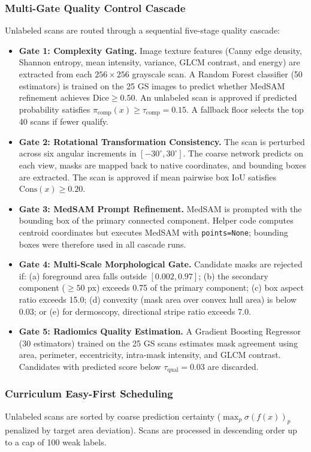 \documentclass[journal,11pt,onecolumn,draftclsnofoot]{IEEEtran}
\begin{document}
\subsubsection{Multi-Gate Quality Control Cascade}
Unlabeled scans are routed through a sequential five-stage quality cascade:
\begin{itemize}
    \item \textbf{Gate 1: Complexity Gating.} Image texture features (Canny edge density, Shannon entropy, mean intensity, variance, GLCM contrast, and energy) are extracted from each $256 \times 256$ grayscale scan. A Random Forest classifier (50 estimators) is trained on the 25 GS images to predict whether MedSAM refinement achieves $\mathrm{Dice} \ge 0.50$. An unlabeled scan is approved if predicted probability satisfies $\pi_{\text{comp}}(x) \ge \tau_{\text{comp}} = 0.15$. A fallback floor selects the top 40 scans if fewer qualify.
    \item \textbf{Gate 2: Rotational Transformation Consistency.} The scan is perturbed across six angular increments in $[-30^\circ, 30^\circ]$. The coarse network predicts on each view, masks are mapped back to native coordinates, and bounding boxes are extracted. The scan is approved if mean pairwise box IoU satisfies $\text{Cons}(x) \ge 0.20$.
    \item \textbf{Gate 3: MedSAM Prompt Refinement.} MedSAM is prompted with the bounding box of the primary connected component. Helper code computes centroid coordinates but executes MedSAM with \texttt{points=None}; bounding boxes were therefore used in all cascade runs.
    \item \textbf{Gate 4: Multi-Scale Morphological Gate.} Candidate masks are rejected if: (a) foreground area falls outside $[0.002, 0.97]$; (b) the secondary component ($\ge 50$ px) exceeds 0.75 of the primary component; (c) box aspect ratio exceeds 15.0; (d) convexity (mask area over convex hull area) is below 0.03; or (e) for dermoscopy, directional stripe ratio exceeds 7.0.
    \item \textbf{Gate 5: Radiomics Quality Estimation.} A Gradient Boosting Regressor (30 estimators) trained on the 25 GS scans estimates mask agreement using area, perimeter, eccentricity, intra-mask intensity, and GLCM contrast. Candidates with predicted score below $\tau_{\text{qual}} = 0.03$ are discarded.
\end{itemize}

\subsubsection{Curriculum Easy-First Scheduling}
Unlabeled scans are sorted by coarse prediction certainty ($\max_p \sigma(f(x))_p$ penalized by target area deviation). Scans are processed in descending order up to a cap of 100 weak labels.
\end{document}
